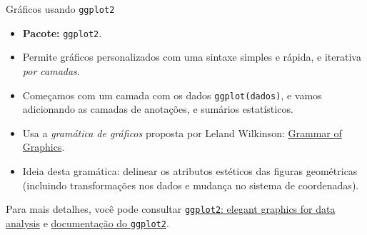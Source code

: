 \documentclass[
  10pt,
  ignorenonframetext,
]{beamer}
\providecommand{\tightlist}{%
  \setlength{\itemsep}{0pt}\setlength{\parskip}{0pt}}\usepackage{longtable,booktabs,array}
\begin{document}
\begin{frame}[fragile]{Gráficos usando \texttt{ggplot2}}
\protect\hypertarget{gruxe1ficos-usando-ggplot2}{}
\begin{itemize}
\tightlist
\item
  \textbf{Pacote:} \texttt{ggplot2}.
\item
  Permite gráficos personalizados com uma sintaxe simples e rápida, e
  iterativa \emph{por camadas}.
\item
  Começamos com um camada com os dados \texttt{ggplot(dados)}, e vamos
  adicionando as camadas de anotações, e sumários estatísticos.
\item
  Usa a \emph{gramática de gráficos} proposta por Leland Wilkinson:
  \href{https://www.springer.com/gp/book/9780387245447}{Grammar of
  Graphics}.
\item
  Ideia desta gramática: delinear os atributos estéticos das figuras
  geométricas (incluindo transformações nos dados e mudança no sistema
  de coordenadas).
\end{itemize}

Para mais detalhes, você pode consultar
\href{https://ggplot2-book.org}{\texttt{ggplot2}: elegant graphics for
data analysis} e \href{https://ggplot2.tidyverse.org}{documentação do
\texttt{ggplot2}}.
\end{frame}
\end{document}
